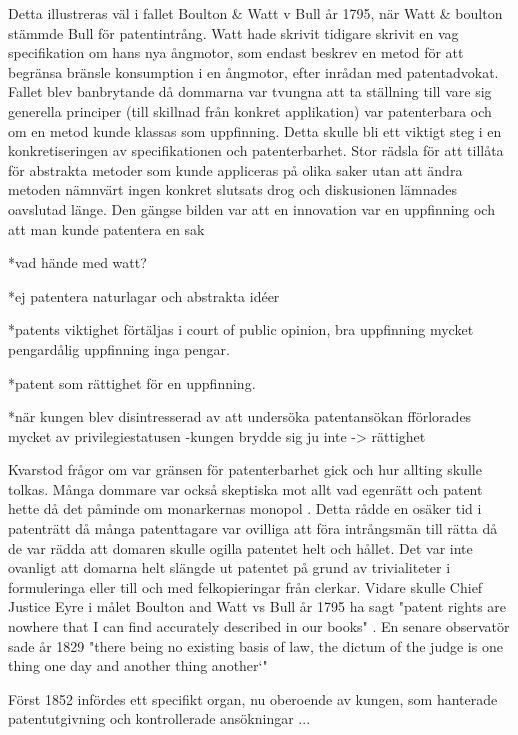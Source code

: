 Detta illustreras väl i fallet Boulton \& Watt v Bull år 1795, när Watt \& boulton stämmde Bull för patentintrång. Watt hade skrivit tidigare skrivit en vag specifikation om hans nya ångmotor, som endast beskrev en metod för att begränsa bränsle konsumption i en ångmotor, efter inrådan med patentadvokat\cite{bracha}. Fallet blev banbrytande då dommarna var tvungna att ta ställning till vare sig generella principer (till skillnad från konkret applikation) var patenterbara och om en metod kunde klassas som uppfinning\cite{bracha}. Detta skulle bli ett viktigt steg i en konkretiseringen av specifikationen och patenterbarhet. Stor rädsla för att tillåta för abstrakta metoder som kunde appliceras på olika saker utan att ändra metoden nämnvärt ingen konkret slutsats drog och diskusionen lämnades oavslutad länge. Den gängse bilden var att en innovation var en uppfinning och att man kunde patentera en sak \cite{bracha}

*vad hände med watt?

*ej patentera naturlagar och abstrakta idéer 

*patents viktighet förtäljas i court of public opinion, bra uppfinning mycket pengardålig uppfinning inga pengar.

*patent som rättighet för en uppfinning.

*när kungen blev disintresserad av att undersöka patentansökan fförlorades mycket av privilegiestatusen -kungen brydde sig ju inte -> rättighet


Kvarstod frågor om var gränsen för patenterbarhet gick och hur allting skulle tolkas\cite{bracha}. Många dommare var också skeptiska mot allt vad egenrätt och patent hette då det påminde om monarkernas monopol \cite{macleod ??? }.
Detta rådde en osäker tid i patenträtt då många patenttagare var ovilliga att föra intrångsmän till
rätta då de var rädda att domaren skulle ogilla patentet helt och hållet. Det var inte ovanligt att
domarna helt slängde ut patentet på grund av trivialiteter i formuleringa eller till och med
felkopieringar från clerkar\cite{macleod}. Vidare skulle Chief Justice Eyre i målet Boulton and Watt vs Bull år 1795 ha sagt "patent rights are nowhere that I can find accurately described in our books" \cite{macleod}. En senare observatör sade år 1829 "there being no existing basis of law, the dictum of the judge is 
one thing one day and another thing another‘" \cite{macleod}

Först 1852 infördes ett specifikt organ, nu oberoende av kungen, som hanterade patentutgivning och kontrollerade ansökningar ...

